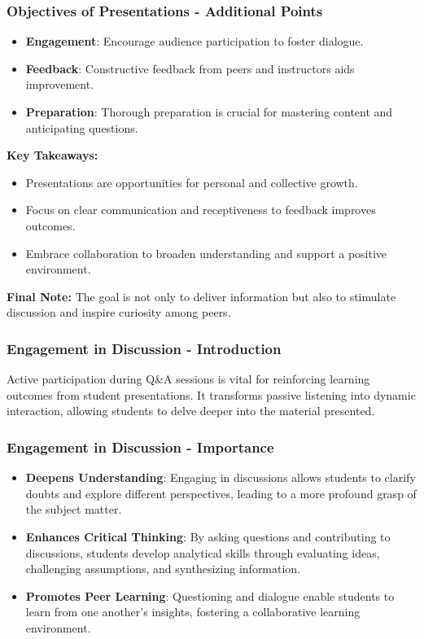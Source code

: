 \documentclass[aspectratio=169]{beamer}
\begin{document}
\begin{frame}[fragile]
    \frametitle{Objectives of Presentations - Additional Points}
    \begin{itemize}
        \item \textbf{Engagement}: Encourage audience participation to foster dialogue.
        \item \textbf{Feedback}: Constructive feedback from peers and instructors aids improvement.
        \item \textbf{Preparation}: Thorough preparation is crucial for mastering content and anticipating questions.
    \end{itemize}
    
    \textbf{Key Takeaways:}
    \begin{itemize}
        \item Presentations are opportunities for personal and collective growth.
        \item Focus on clear communication and receptiveness to feedback improves outcomes.
        \item Embrace collaboration to broaden understanding and support a positive environment.
    \end{itemize}
    
    \textbf{Final Note:} The goal is not only to deliver information but also to stimulate discussion and inspire curiosity among peers.
\end{frame}

\begin{frame}[fragile]
    \frametitle{Engagement in Discussion - Introduction}
    Active participation during Q\&A sessions is vital for reinforcing learning outcomes from student presentations. It transforms passive listening into dynamic interaction, allowing students to delve deeper into the material presented.
\end{frame}

\begin{frame}[fragile]
    \frametitle{Engagement in Discussion - Importance}
    \begin{itemize}
        \item \textbf{Deepens Understanding}: Engaging in discussions allows students to clarify doubts and explore different perspectives, leading to a more profound grasp of the subject matter.
        \item \textbf{Enhances Critical Thinking}: By asking questions and contributing to discussions, students develop analytical skills through evaluating ideas, challenging assumptions, and synthesizing information.
        \item \textbf{Promotes Peer Learning}: Questioning and dialogue enable students to learn from one another's insights, fostering a collaborative learning environment.
    \end{itemize}
\end{frame}
\end{document}
